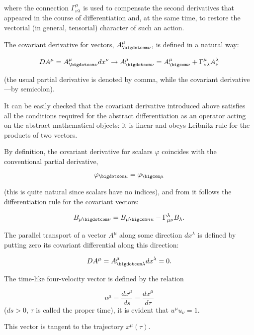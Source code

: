 where the connection $\Gamma ^{\mu}_{\nu \lambda}$ is used to compensate the second derivatives that appeared in the course of differentiation and, at the same time, to restore the vectorial (in general, tensorial) character of such an action. 

The covariant derivative for vectors, $A^{\mu}_{\bigdotcom \nu}$, is defined in a natural way: 

$$

DA^{\mu} = A^{\mu}_{\bigdotcom \nu} dx^{\nu} \to A^{\mu}_{\bigdotcom \nu} = A^{\mu}_{\bigcom \nu} + \Gamma ^{\mu}_{\nu \lambda} A^{\lambda}_{\nu}

$$ 

(the usual partial derivative is denoted by comma, while the covariant derivative---by semicolon). 

It can be easily checked that the covariant derivative introduced above satisfies all the conditions required for the abstract differentiation as an operator acting on the abstract mathematical objects: it is linear and obeys Leibnitz rule for the products of two vectors. 

By definition, the covariant derivative for scalars $\varphi$ coincides with the conventional partial derivative, $$

\varphi _{\bigdotcom \mu} = \varphi_{\bigcom \mu}

$$ 

(this is quite natural since scalars have no indices), and from it follows the differentiation rule for the covariant vectors: 

$$B_{\mu \bigdotcom \nu} = B_{\mu \bigcom nu} - \Gamma ^{\lambda}_{\mu \nu}B_{\lambda}.$$



The parallel transport of a vector $A^{\mu}$ along some direction $dx^{\lambda}$ is defined by putting zero its covariant differential along this direction: 

$$

DA^{\mu} = A^{\mu}_{\bigdotcom \lambda} dx^{\lambda} = 0.

$$ 

The time-like four-velocity vector is defined by the relation 

$$

u^{\mu} = \frac{dx^{\mu}}{ds} = \frac{dx^{\mu}}{d \tau}

$$ ($ds > 0$, $\tau$ is called the proper time), it is evident that $u^{\mu} u_{\nu} = 1$. 

This vector is tangent to the trajectory $x^{\mu} (\tau)$. 

